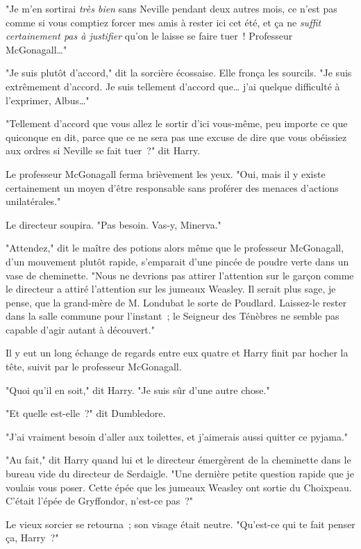 "Je m'en sortirai \emph{très bien} sans Neville pendant deux autres mois, ce n'est pas comme si vous comptiez forcer mes amis à rester ici cet été, et ça ne \emph{suffit certainement pas à justifier} qu'on le laisse se faire tuer~! Professeur McGonagall…"

"Je suis plutôt d'accord," dit la sorcière écossaise. Elle fronça les sourcils. "Je suis extrêmement d'accord. Je suis tellement d'accord que… j'ai quelque difficulté à l'exprimer, Albus…"

"Tellement d'accord que vous allez le sortir d'ici vous-même, peu importe ce que quiconque en dit, parce que ce ne sera pas une excuse de dire que vous obéissiez aux ordres si Neville se fait tuer~?" dit Harry.

Le professeur McGonagall ferma brièvement les yeux. "Oui, mais il y existe certainement un moyen d'être responsable sans proférer des menaces d'actions unilatérales."

Le directeur soupira. "Pas besoin. Vas-y, Minerva."

"Attendez," dit le maître des potions alors même que le professeur McGonagall, d'un mouvement plutôt rapide, s'emparait d'une pincée de poudre verte dans un vase de cheminette. "Nous ne devrions pas attirer l'attention sur le garçon comme le directeur a attiré l'attention sur les jumeaux Weasley. Il serait plus sage, je pense, que la grand-mère de M. Londubat le sorte de Poudlard. Laissez-le rester dans la salle commune pour l'instant~; le Seigneur des Ténèbres ne semble pas capable d'agir autant à découvert."

Il y eut un long échange de regards entre eux quatre et Harry finit par hocher la tête, suivit par le professeur McGonagall.

"Quoi qu'il en soit," dit Harry. "Je suis sûr d'une autre chose."

"Et quelle est-elle~?" dit Dumbledore.

"J'ai vraiment besoin d'aller aux toilettes, et j'aimerais aussi quitter ce pyjama."

\later

"Au fait," dit Harry quand lui et le directeur émergèrent de la cheminette dans le bureau vide du directeur de Serdaigle. "Une dernière petite question rapide que je voulais vous poser. Cette épée que les jumeaux Weasley ont sortie du Choixpeau. C'était l'épée de Gryffondor, n'est-ce pas~?"

Le vieux sorcier se retourna~; son visage était neutre. "Qu'est-ce qui te fait penser ça, Harry~?"

